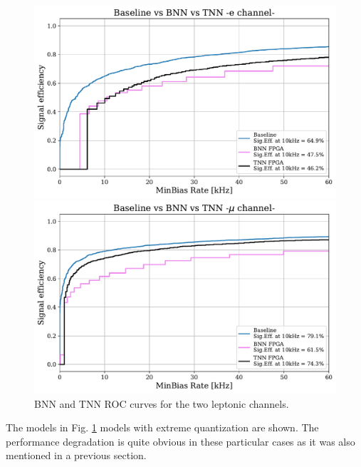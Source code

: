 \documentclass[../../main.tex]{subfiles}
\begin{document}
\begin{figure}[h] 
  \label{ fig7} 
  \begin{minipage}[b]{0.5\linewidth}
    \centering
    \includegraphics[width=.9\linewidth]{sections/05/Images/Results_BT_1eleFPGA.pdf} 
    \vspace{4ex}
  \end{minipage}%
  \begin{minipage}[b]{0.5\linewidth}
    \centering
    \includegraphics[width=.9\linewidth]{sections/05/Images/Results_BT_1muFPGA.pdf}
    \vspace{4ex}
  \end{minipage} 
  \caption{BNN and TNN ROC curves for the two leptonic channels.}
  \label{fig:BTmodels_fpga}
\end{figure}

The models in Fig. \ref{fig:BTmodels_fpga} models with extreme quantization are shown. The performance degradation is quite obvious in these particular cases as it was also mentioned in a previous section.    
\end{document}
